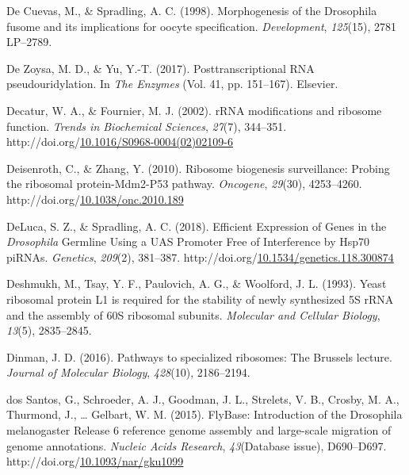 \documentclass[12pt,oneside]{reedthesis}
\newlength{\cslhangindent}
\newenvironment{CSLReferences}[2] %
 {%
  \setlength{\parindent}{0pt}
  \ifodd #1 \everypar{\setlength{\hangindent}{\cslhangindent}}\ignorespaces\fi
  \ifnum #2 > 0
  \setlength{\parskip}{#2\baselineskip}
  \fi
 }%
 {}
\begin{document}
\begin{CSLReferences}{1}{0}
\leavevmode{}%
De Cuevas, M., \& Spradling, A. C. (1998). Morphogenesis of the {Drosophila} fusome and its implications for oocyte specification. \emph{Development}, \emph{125}(15), 2781 LP--2789.

\leavevmode{}%
De Zoysa, M. D., \& Yu, Y.-T. (2017). Posttranscriptional {RNA} pseudouridylation. In \emph{The {Enzymes}} (Vol. 41, pp. 151--167). {Elsevier}.

\leavevmode{}%
Decatur, W. A., \& Fournier, M. J. (2002). {rRNA} modifications and ribosome function. \emph{Trends in Biochemical Sciences}, \emph{27}(7), 344--351. http://doi.org/\href{https://doi.org/10.1016/S0968-0004(02)02109-6}{10.1016/S0968-0004(02)02109-6}

\leavevmode{}%
Deisenroth, C., \& Zhang, Y. (2010). Ribosome biogenesis surveillance: {Probing} the ribosomal protein-{Mdm2}-P53 pathway. \emph{Oncogene}, \emph{29}(30), 4253--4260. http://doi.org/\href{https://doi.org/10.1038/onc.2010.189}{10.1038/onc.2010.189}

\leavevmode{}%
DeLuca, S. Z., \& Spradling, A. C. (2018). Efficient {Expression} of {Genes} in the {\emph{Drosophila}} {Germline Using} a {UAS Promoter Free} of {Interference} by {Hsp70 piRNAs}. \emph{Genetics}, \emph{209}(2), 381--387. http://doi.org/\href{https://doi.org/10.1534/genetics.118.300874}{10.1534/genetics.118.300874}

\leavevmode{}%
Deshmukh, M., Tsay, Y. F., Paulovich, A. G., \& Woolford, J. L. (1993). Yeast ribosomal protein {L1} is required for the stability of newly synthesized {5S rRNA} and the assembly of {60S} ribosomal subunits. \emph{Molecular and Cellular Biology}, \emph{13}(5), 2835--2845.

\leavevmode{}%
Dinman, J. D. (2016). Pathways to specialized ribosomes: The {Brussels} lecture. \emph{Journal of Molecular Biology}, \emph{428}(10), 2186--2194.

\leavevmode{}%
dos Santos, G., Schroeder, A. J., Goodman, J. L., Strelets, V. B., Crosby, M. A., Thurmond, J., \ldots{} Gelbart, W. M. (2015). {FlyBase}: Introduction of the {Drosophila} melanogaster {Release} 6 reference genome assembly and large-scale migration of genome annotations. \emph{Nucleic Acids Research}, \emph{43}(Database issue), D690--D697. http://doi.org/\href{https://doi.org/10.1093/nar/gku1099}{10.1093/nar/gku1099}


\end{CSLReferences}
\end{document}
